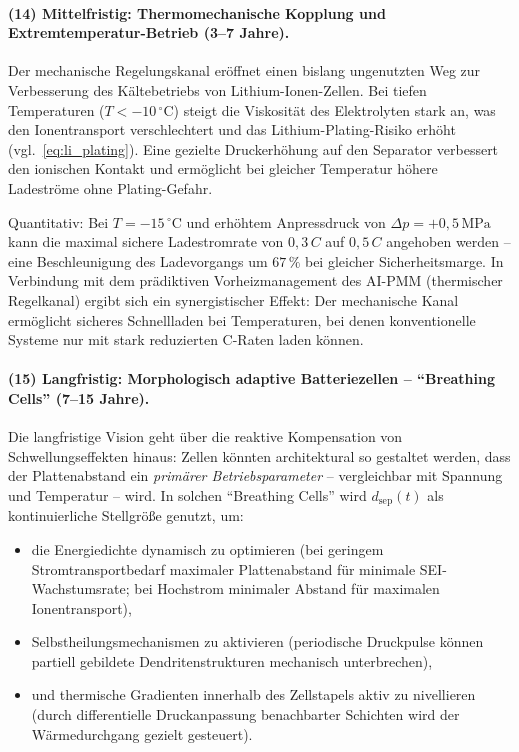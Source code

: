 ﻿\documentclass[12pt,a4paper]{article}
\begin{document}
\paragraph{(14) Mittelfristig: Thermomechanische Kopplung und
	Extremtemperatur-Betrieb (3--7 Jahre).}
Der mechanische Regelungskanal eröffnet einen bislang ungenutzten Weg
zur Verbesserung des Kältebetriebs von Lithium-Ionen-Zellen. Bei tiefen
Temperaturen ($T < -10\,^\circ\mathrm{C}$) steigt die Viskosität des
Elektrolyten stark an, was den Ionentransport verschlechtert und das
Lithium-Plating-Risiko erhöht (vgl.\ \eqref{eq:li_plating}). Eine
gezielte Druckerhöhung auf den Separator verbessert den ionischen Kontakt
und ermöglicht bei gleicher Temperatur höhere Ladeströme ohne Plating-Gefahr.

Quantitativ: Bei $T = -15\,^\circ\mathrm{C}$ und erhöhtem Anpressdruck
von $\Delta p = +0{,}5\,\mathrm{MPa}$ kann die maximal sichere Ladestromrate
von $0{,}3\,C$ auf $0{,}5\,C$ angehoben werden -- eine Beschleunigung des
Ladevorgangs um $67\,\%$ bei gleicher Sicherheitsmarge. In Verbindung mit
dem prädiktiven Vorheizmanagement des AI-PMM (thermischer Regelkanal) ergibt
sich ein synergistischer Effekt: Der mechanische Kanal ermöglicht sicheres
Schnellladen bei Temperaturen, bei denen konventionelle Systeme nur mit stark
reduzierten C-Raten laden können.

\paragraph{(15) Langfristig: Morphologisch adaptive Batteriezellen --
	``Breathing Cells'' (7--15 Jahre).}
Die langfristige Vision geht über die reaktive Kompensation von
Schwellungseffekten hinaus: Zellen könnten architektural so gestaltet werden,
dass der Plattenabstand ein \textit{primärer Betriebsparameter} -- vergleichbar
mit Spannung und Temperatur -- wird. In solchen ``Breathing Cells'' wird
$d_\mathrm{sep}(t)$ als kontinuierliche Stellgröße genutzt, um:

\begin{itemize}[leftmargin=*]
	\item die Energiedichte dynamisch zu optimieren (bei geringem Stromtransportbedarf
	maximaler Plattenabstand für minimale SEI-Wachstumsrate; bei Hochstrom
	minimaler Abstand für maximalen Ionentransport),
	\item Selbstheilungsmechanismen zu aktivieren (periodische Druckpulse
	können partiell gebildete Dendritenstrukturen mechanisch unterbrechen),
	\item und thermische Gradienten innerhalb des Zellstapels aktiv zu
	nivellieren (durch differentielle Druckanpassung benachbarter Schichten
	wird der Wärmedurchgang gezielt gesteuert).
\end{itemize}
\end{document}
